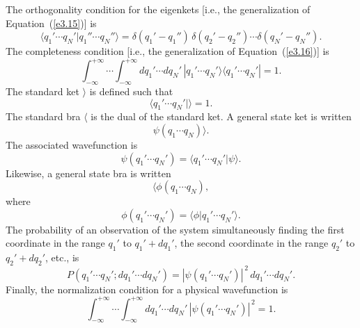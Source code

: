 The orthogonality condition for the eigenkets [{\rm i.e.}, the generalization of
Equation~(\ref{e3.15})] is
\begin{equation}
\langle q_1'\cdots q_N'| q_1''\cdots q_N''\rangle = \delta(q_1'-q_1'')\,\delta(q_2'-q_2'')\cdots
\delta(q_N'-q_N'').
\end{equation}
The completeness condition [{\rm i.e.}, the generalization of Equation~(\ref{e3.16})] is
\begin{equation}
\int_{-\infty}^{+\infty} \cdots\int_{-\infty}^{+\infty} dq_1' \cdots dq_N'\,
|q_1'\cdots q_N'\rangle \langle q_1'\cdots q_N'| = 1.
\end{equation}
The standard ket $\rangle$ is defined such that
\begin{equation}\label{e3.50}
\langle q_1'\cdots q_N'|\rangle = 1.
\end{equation}
The standard bra $\langle$ is the dual of the standard ket. A general state 
ket is written
\begin{equation}
\psi(q_1\cdots q_N)\rangle.
\end{equation}
The associated wavefunction is
\begin{equation}
\psi(q_1'\cdots q_N') = \langle q_1'\cdots q_N'|\psi\rangle.
\end{equation}
Likewise, a general state bra is written
\begin{equation}
\langle \phi(q_1\cdots q_N),
\end{equation}
where
\begin{equation}
\phi(q_1'\cdots q_N') = \langle \phi|q_1'\cdots q_N'\rangle.
\end{equation}
The probability of an observation of the system simultaneously finding the first coordinate in
the range $q_1'$ to $q_1'+dq_1'$, the second coordinate in the range $q_2'$ to $q_2'
+dq_2'$, {\rm etc.}, is
\begin{equation}
P(q_1'\cdots q_N'; dq_1'\cdots dq_N') = |\psi(q_1'\cdots q_N')|^{\,2}\,dq_1'\cdots 
dq_N'.
\end{equation}
Finally, the normalization condition for a physical wavefunction is
\begin{equation}
\int_{-\infty}^{+\infty} \cdots \int_{-\infty}^{+\infty}dq_1'\cdots dq_N' \,
|\psi(q_1'\cdots q_N')|^{\,2}= 1.
\end{equation}

